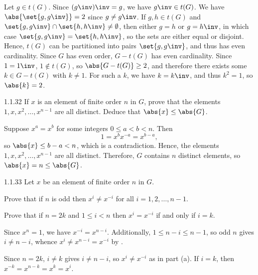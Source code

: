 \begin{sol}
    Let $g \in t(G)$.
    Since $(g\inv)\inv = g$, we have $g\inv \in t(G)$.
    We have $\abs{\set{g, g\inv}} = 2$ since $g \neq g\inv$.
    If $g, h \in t(G)$ and $\set{g, g\inv} \cap \set{h, h\inv} \neq \emptyset$, then either $g = h$ or $g = h\inv$, in which case $\set{g, g\inv} = \set{h, h\inv}$, so the sets are either equal or disjoint.
    Hence, $t(G)$ can be partitioned into pairs $\set{g, g\inv}$, and thus has even cardinality.
    Since $G$ has even order, $G - t(G)$ has even cardinality.
    Since $1 = 1\inv$, $1 \notin t(G)$, so $\abs{G - t(G)} \geq 2$, and therefore there exists some $k \in G - t(G)$ with $k \neq 1$.
    For such a $k$, we have $k = k\inv$, and thus $k^2 = 1$, so $\abs{k} = 2$.
\end{sol}

\begin{exercise}{1.1.32}
    If $x$ is an element of finite order $n$ in $G$, prove that the elements $1, x, x^2, \dots, x^{n-1}$ are all distinct.
	Deduce that $\abs{x} \leq \abs{G}$.
\end{exercise}

\begin{sol}
	Suppose $x^a = x^b$ for some integers $0 \leq a < b < n$.
	Then
    \[
    	1 = x^b x^{-a} = x^{b - a},
    \]
    so $\abs{x} \leq b - a < n$, which is a contradiction.
	Hence, the elements $1, x, x^2, \dots, x^{n-1}$ are all distinct.
	Therefore, $G$ contains $n$ distinct elements, so $\abs{x} = n \leq \abs{G}$.
\end{sol}

\begin{exercise}{1.1.33}
    Let $x$ be an element of finite order $n$ in $G$.
    \begin{subexercises}
        \item Prove that if $n$ is odd then $x^i \neq x^{-i}$ for all $i = 1, 2, \dots, n-1$.
        \item Prove that if $n = 2k$ and $1 \leq i < n$ then $x^i = x^{-i}$ if and only if $i = k$.
    \end{subexercises}
\end{exercise}

\begin{solenum}
    \item Since $x^n = 1$, we have $x^{-i} = x^{n-i}$.
    Additionally, $1 \leq n-i \leq n-1$, so odd $n$ gives $i \neq n-i$, whence $x^i \neq x^{n-i} = x^{-i}$ by .
    \item Since $n = 2k$, $i \neq k$ gives $i \neq n-i$, so $x^i \neq x^{-i}$ as in part (a).
	If $i = k$, then $x^{-k} = x^{n-k} = x^k = x^i$.
\end{solenum}

